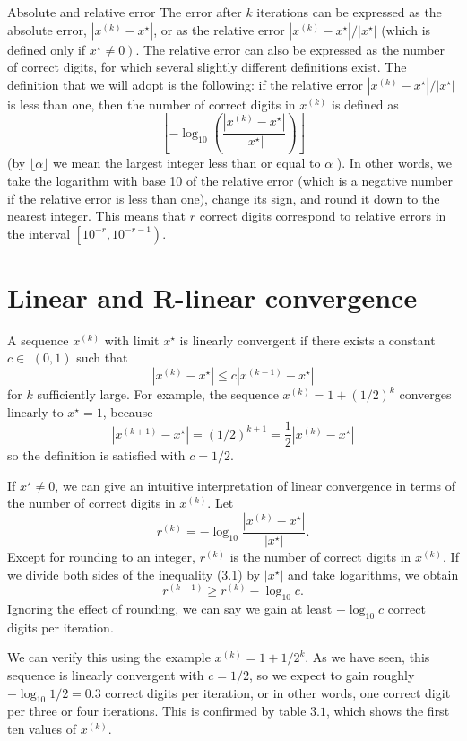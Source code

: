 Absolute and relative error The error after $ k $ iterations can be expressed as the absolute error, $ \left|x^{(k)}-x^{\star}\right| $, or as the relative error $ \left|x^{(k)}-x^{\star}\right| /\left|x^{\star}\right| $ (which is defined only if $ \left.x^{\star} \neq 0\right) $. The relative error can also be expressed as the number of correct digits, for which several slightly different definitions exist. The definition that we will adopt is the following: if the relative error $ \left|x^{(k)}-x^{\star}\right| /\left|x^{\star}\right| $ is less than one, then the number of correct digits in $ x^{(k)} $ is defined as
$$
\left\lfloor-\log _{10}\left(\frac{\left|x^{(k)}-x^{\star}\right|}{\left|x^{\star}\right|}\right)\right\rfloor
$$
(by $ \lfloor\alpha\rfloor $ we mean the largest integer less than or equal to $ \alpha $ ). In other words, we take the logarithm with base 10 of the relative error (which is a negative number if the relative error is less than one), change its sign, and round it down to the nearest integer. This means that $ r $ correct digits correspond to relative errors in the interval $ \left[10^{-r}, 10^{-r-1}\right) $.

\section{ Linear and R-linear convergence}

A sequence $ x^{(k)} $ with limit $ x^{\star} $ is linearly convergent if there exists a constant $ c \in $ $ (0,1) $ such that
$$
\left|x^{(k)}-x^{\star}\right| \leq c\left|x^{(k-1)}-x^{\star}\right|
$$
for $ k $ sufficiently large. For example, the sequence $ x^{(k)}=1+(1 / 2)^{k} $ converges linearly to $ x^{\star}=1 $, because
$$
\left|x^{(k+1)}-x^{\star}\right|=(1 / 2)^{k+1}=\frac{1}{2}\left|x^{(k)}-x^{\star}\right|
$$
so the definition is satisfied with $ c=1 / 2 $.

If $ x^{\star} \neq 0 $, we can give an intuitive interpretation of linear convergence in terms of the number of correct digits in $ x^{(k)} $. Let
$$
r^{(k)}=-\log _{10} \frac{\left|x^{(k)}-x^{\star}\right|}{\left|x^{\star}\right|} .
$$
Except for rounding to an integer, $ r^{(k)} $ is the number of correct digits in $ x^{(k)} $. If we divide both sides of the inequality (3.1) by $ \left|x^{\star}\right| $ and take logarithms, we obtain
$$
r^{(k+1)} \geq r^{(k)}-\log _{10} c .
$$
Ignoring the effect of rounding, we can say we gain at least $ -\log _{10} c $ correct digits per iteration.

We can verify this using the example $ x^{(k)}=1+1 / 2^{k} $. As we have seen, this sequence is linearly convergent with $ c=1 / 2 $, so we expect to gain roughly $ -\log _{10} 1 / 2=0.3 $ correct digits per iteration, or in other words, one correct digit per three or four iterations. This is confirmed by table $ 3.1 $, which shows the first ten values of $ x^{(k)} $.

